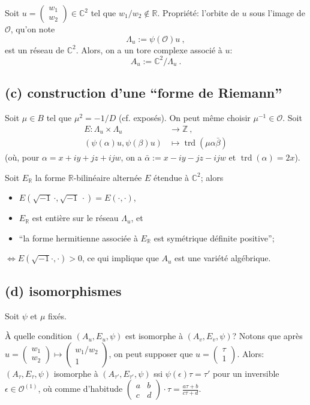 \documentclass[a4paper]{article}
\newcommand{\CC}{\mathbb{C}}
\newcommand{\RR}{\mathbb{R}}
\newcommand{\ZZ}{\mathbb{Z}}
\newcommand{\OO}{\mathcal{O}}
\DeclareMathOperator*{\trd}{trd}
\newcommand{\cvtwo}[2]{{\left(\begin{array}{c}{#1}\\ {#2}\end{array}\right)}}
\newcommand{\mtwo}[4]{{\left(\begin{array}{cc}{#1} & {#2} \\ {#3} & {#4}\end{array}\right)}}
\begin{document}
Soit \(u = \cvtwo{w_1}{w_2} \in \CC^2\)
tel que \(w_1/w_2 \notin \RR\).
Propriété: l'orbite de \(u\) sous l'image de \(\OO\), qu'on note
\[
    \Lambda_u := \psi(\OO)u
    \ ,
\]
est un réseau de \(\CC^2\).
Alors, on a un tore complexe associé à \(u\):
\[
    A_u := \CC^2/\Lambda_u
    \ .
\]

\subsection*{(c) construction d'une ``forme de Riemann''}

Soit \(\mu \in B\) tel que \(\mu^2 = -1/D\)
(cf. exposés). On peut même choisir \(\mu^{-1}\in \OO\).
Soit 
\begin{align*}
    E : \Lambda_u\times\Lambda_u 
    & 
    \longrightarrow \ZZ
    \ ,
    \\
    (\psi(\alpha)u, \psi(\beta)u) 
    & 
    \longmapsto \trd(\mu\alpha\bar\beta)
\end{align*}
(où, pour \(\alpha = x + iy + jz + ijw\),
on a \(\bar\alpha := x - iy - jz - ijw\)
et \(\trd(\alpha) = 2x\)).

Soit \(E_\RR\) la forme \(\RR\)-bilinéaire alternée \(E\)
étendue à \(\CC^2\); alors
\begin{itemize}
    \item
        \(E(\sqrt{-1}\,\cdot,\sqrt{-1}\,\cdot) = E(\cdot,\cdot)\),
    \item
        \(E_\RR\) est entière sur le réseau \(\Lambda_u\), et
    \item
        ``la forme hermitienne associée à \(E_\RR\)
        est symétrique définite positive'';
\end{itemize}
\(\iff E(\sqrt{-1}\cdot,\cdot) > 0\),
ce qui implique que \(A_u\) est une variété algébrique.

\subsection*{(d) isomorphismes}

Soit \(\psi\) et \(\mu\) fixés.

À quelle condition
\((A_u,E_u,\psi)\) est isomorphe à \((A_v,E_v,\psi)\)?
Notons que après \(u = \cvtwo{w_1}{w_2} \mapsto \cvtwo{w_1/w_2}{1}\),
on peut supposer que 
\(u = \cvtwo{\tau}{1}\).
Alors:
\((A_\tau,E_\tau,\psi)\) isomorphe à \((A_{\tau'},E_{\tau'},\psi)\)
ssi 
\(\psi(\epsilon)\tau = \tau'\)
pour un inversible \(\epsilon\in\OO^{(1)}\),
où comme d'habitude
\(\mtwo{a}{b}{c}{d}\cdot\tau = \frac{a\tau + b}{c\tau + d}\).
\end{document}
